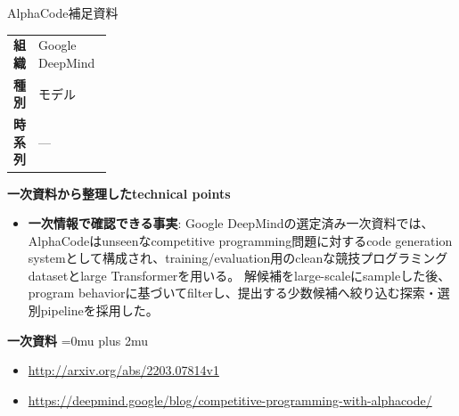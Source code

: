 \begin{technicalnote}{AlphaCode}{補足資料}
\begingroup
\begin{tabularx}{\linewidth}{@{}>{\bfseries}p{0.22\linewidth}X@{}}
組織 & Google DeepMind \\
種別 & モデル \\
時系列 & — \\
\end{tabularx}
\smallskip
{\bfseries 一次資料から整理したtechnical points}
\begin{itemize}[leftmargin=1.5em,itemsep=0.35em]
\item \textbf{一次情報で確認できる事実}: Google DeepMindの選定済み一次資料では、AlphaCodeはunseenなcompetitive programming問題に対するcode generation systemとして構成され、training/evaluation用のcleanな競技プログラミングdatasetとlarge Transformerを用いる。 解候補をlarge-scaleにsampleした後、program behaviorに基づいてfilterし、提出する少数候補へ絞り込む探索・選別pipelineを採用した。
\end{itemize}
\begin{minipage}{\linewidth}
\begin{samepage}
{\bfseries 一次資料}
\begingroup\sloppy
\Urlmuskip=0mu plus 2mu\relax
\begin{itemize}[leftmargin=1.5em,itemsep=0.25em]
\item {\scriptsize\url{http://arxiv.org/abs/2203.07814v1}}
\item {\scriptsize\url{https://deepmind.google/blog/competitive-programming-with-alphacode/}}
\end{itemize}
\endgroup
\end{samepage}
\end{minipage}
\endgroup
\end{technicalnote}
\medskip

